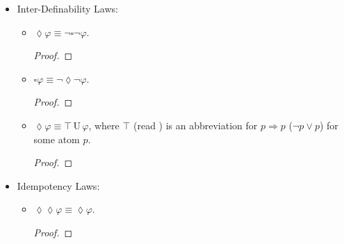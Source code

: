 \documentclass[12pt]{article}
\newcommand{\imp}{\Rightarrow}
\newcommand{\until}{\,\mathrm{U}\,}
\newcommand{\iscircle}{\mathord{\scalerel*{\bigcirc}{\square}}}
\begin{document}
\begin{itemize}
\begin{itemize}
\begin{proof}
            \end{proof}
            \item $\lozenge(\varphi \lor \psi) \equiv \lozenge\varphi \lor \lozenge\psi$.
            \begin{proof}
                
            \end{proof}
            \item $\iscircle(\varphi \until \psi) \equiv \iscircle\varphi \until \iscircle\psi$.
            \begin{proof}
                
            \end{proof}
            \item $\square(\varphi \lor \psi) \not\equiv \square\varphi \lor \square\psi$.
            \begin{proof}
                
            \end{proof}
            \item $\lozenge(\varphi \land \psi) \not\equiv \lozenge\varphi \land \lozenge\psi$.
            \begin{proof}
                
            \end{proof}
        \end{itemize}
        \item Inter-Definability Laws:
        \begin{itemize}
            \item $\lozenge\varphi \equiv \neg\square\neg\varphi$.
            \begin{proof}
                
            \end{proof}
            \item $\square\varphi \equiv \neg\lozenge\neg\varphi$.
            \begin{proof}
                
            \end{proof}
            \item $\lozenge\varphi \equiv \top \until \varphi$, where $\top$ (read ) is an abbreviation for $p \imp p$ ($\neg{p} \lor p$) for some atom $p$.
            \begin{proof}
                
            \end{proof}
        \end{itemize}
        \item Idempotency Laws:
        \begin{itemize}
            \item $\lozenge\lozenge\varphi \equiv \lozenge\varphi$.
            \begin{proof}
                

\end{proof}
\end{itemize}
\end{itemize}
\end{document}
